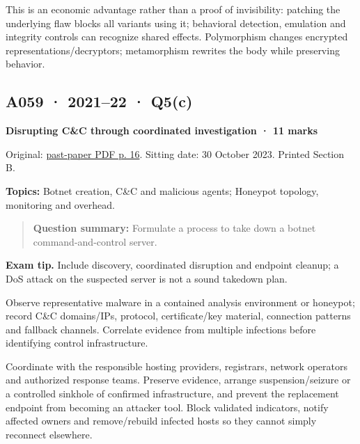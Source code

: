 \documentclass[11pt,a4paper]{article}
\begin{document}
This is an economic advantage rather than a proof of invisibility: patching the underlying flaw blocks all variants using it; behavioral detection,\allowbreak{} emulation and integrity controls can recognize shared effects. Polymorphism changes encrypted representations/\allowbreak{}decryptors; metamorphism rewrites the body while preserving behavior.




\clearpage
\subsection{A059 · 2021–22 · Q5(c)}\label{a059}

\textbf{Disrupting C\&C through coordinated investigation · 11 marks}


Original: \href{../../CSE405-Security_Merged.pdf\#page=16}{past-paper PDF p. 16}. Sitting date: 30 October 2023. Printed Section B.


\textbf{Topics:} Botnet creation,\allowbreak{} C\&C and malicious agents; Honeypot topology,\allowbreak{} monitoring and overhead.



\begin{quote}\small

\textbf{Question summary:} Formulate a process to take down a botnet command-and-control server.



\end{quote}


{\color{ForestGreen}\textbf{Exam tip.} Include discovery,\allowbreak{} coordinated disruption and endpoint cleanup; a DoS attack on the suspected server is not a sound takedown plan.}


Observe representative malware in a contained analysis environment or honeypot; record C\&C domains/\allowbreak{}IPs,\allowbreak{} protocol,\allowbreak{} certificate/\allowbreak{}key material,\allowbreak{} connection patterns and fallback channels. Correlate evidence from multiple infections before identifying control infrastructure.


Coordinate with the responsible hosting providers,\allowbreak{} registrars,\allowbreak{} network operators and authorized response teams. Preserve evidence,\allowbreak{} arrange suspension/\allowbreak{}seizure or a controlled sinkhole of confirmed infrastructure,\allowbreak{} and prevent the replacement endpoint from becoming an attacker tool. Block validated indicators,\allowbreak{} notify affected owners and remove/\allowbreak{}rebuild infected hosts so they cannot simply reconnect elsewhere.
\end{document}
